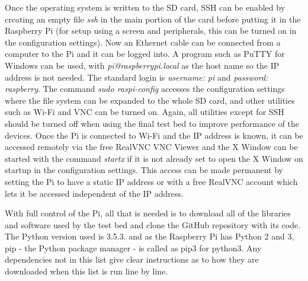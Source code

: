 \documentclass[../main.tex]{subfiles}
\begin{document}

Once the operating system is written to the SD card, SSH can be enabled by creating an empty file \textit{ssh} in the main portion of the card before putting it in the Raspberry Pi (for setup using a screen and peripherals, this can be turned on in the configuration settings).
Now an Ethernet cable can be connected from a computer to the Pi and it can be logged into.
A program such as PuTTY \cite{lib_PuTTY} for Windows can be used, with \textit{pi@raspberrypi.local} as the host name so the IP address is not needed.
The standard login is \textit{username: pi} and \textit{password: raspberry}.
The command \textit{sudo raspi-config} accesses the configuration settings where the file system can be expanded to the whole SD card, and other utilities such as Wi-Fi and VNC can be turned on.
Again, all utilities except for SSH should be turned off when using the final test bed to improve performance of the devices.
Once the Pi is connected to Wi-Fi and the IP address is known, it can be accessed remotely via the free RealVNC VNC Viewer \cite{lib_RealVNCViewer} and the X Window can be started with the command \textit{startx} if it is not already set to open the X Window on startup in the configuration settings.
This access can be made permanent by setting the Pi to have a static IP address or with a free RealVNC account which lets it be accessed independent of the IP address.\\

With full control of the Pi, all that is needed is to download all of the libraries and software used by the test bed and clone the GitHub repository with its code.
The Python version used is 3.5.3.
and as the Raspberry Pi has Python 2 and 3, pip - the Python package manager - is called as pip3 for python3.
Any dependencies not in this list give clear instructions as to how they are downloaded when this list is run line by line.\\
\end{document}
